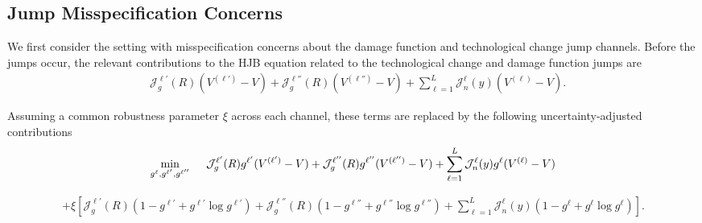 \documentclass[12pt]{article}
\begin{document}
\begin{appendices}

\subsection{Jump Misspecification Concerns}

We first consider the setting with misspecification concerns about the damage function and technological change jump channels. Before the jumps occur, the relevant contributions to the HJB equation related to the technological change and damage function jumps are
\begin{equation*}
\begin{split}
 &  \mathcal{J}^{\ell'}_g(R) (V^{(\ell')}-V) + \mathcal{J}^{\ell''}_g(R) (V^{(\ell'')}-V) + \sum_{\ell=1}^{L} \mathcal{J}^{\ell}_n(y) (V^{(\ell)} - V). 
 \end{split}
\end{equation*}
 
 Assuming a common robustness parameter $\xi$ across each channel, these terms are replaced by the following uncertainty-adjusted contributions
\begin{eqnarray*}
\min_{g^{\ell},g^{\ell'},g^{\ell''}} \hspace{0.1cm} \quad
\mathcal{J}^{\ell'}_g(R) g^{\ell'} (V^{(\ell')}-V) + \mathcal{J}^{\ell''}_g(R) g^{\ell''} (V^{(\ell'')}-V) + \sum_{\ell=1}^{L} \mathcal{J}^{\ell}_n(y) g^{\ell} (V^{(\ell)} - V)
\end{eqnarray*}

\vspace{-0.75cm}

\begin{eqnarray*}
 + \xi \left[ \mathcal{J}^{\ell'}_g(R) \left( 1 - g^{\ell'} + g^{\ell'} \log g^{\ell'} \right)  + \mathcal{J}^{\ell''}_g(R) \left( 1 - g^{\ell''} + g^{\ell''} \log g^{\ell''} \right)  +\sum_{\ell=1}^{L} \mathcal{J}^{\ell}_n(y) \left( 1 - g^{\ell} + g^{\ell} \log g^{\ell} \right) \right].
\end{eqnarray*}


\end{appendices}
\end{document}
